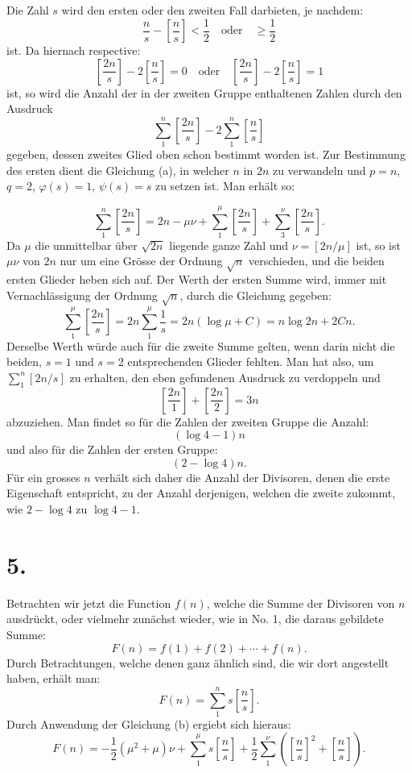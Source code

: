 \documentclass[11pt]{article}
\newcommand{\floor}[1]{\left[#1\right]}
\begin{document}
Die Zahl $s$ wird den ersten oder den zweiten Fall darbieten, je nachdem:
\[
 \frac ns-\floor{\frac ns}<\frac12\quad \text{oder}\quad \geq\frac12
\]
ist. Da hiernach respective:
\[
 \floor{\frac{2n}{s}}-2\floor{\frac ns}=0\quad \text{oder}\quad
 \floor{\frac{2n}{s}}-2\floor{\frac ns}=1
\]
ist, so wird die Anzahl der in der zweiten Gruppe enthaltenen Zahlen durch den Ausdruck
\[
 \sum_{1}^{n}\floor{\frac{2n}{s}}-2\sum_{1}^{n}\floor{\frac ns}
\]
gegeben, dessen zweites Glied oben schon bestimmt worden ist. Zur Bestimmung des ersten dient die Gleichung (a), in welcher $n$ in $2n$ zu verwandeln und $p=n$, $q=2$, $\varphi(s)=1$, $\psi(s)=s$ zu setzen ist. Man erhält so:

\[
 \sum_{1}^{n}\floor{\frac{2n}{s}}=2n-\mu\nu+
 \sum_{1}^{\mu}\floor{\frac{2n}{s}}+
 \sum_{3}^{\nu}\floor{\frac{2n}{s}}.
\]
Da $\mu$ die unmittelbar über $\sqrt{2n}$ liegende ganze Zahl und $\nu=\floor{2n/\mu}$ ist, so ist $\mu\nu$ von $2n$ nur um eine Grösse der Ordnung $\sqrt n$ verschieden, und die beiden ersten Glieder heben sich auf. Der Werth der ersten Summe wird, immer mit Vernachlässigung der Ordnung $\sqrt n$, durch die Gleichung gegeben:
\[
 \sum_{1}^{\mu}\floor{\frac{2n}{s}}=2n\sum_{1}^{\mu}\frac1s=2n(\log\mu+C)=n\log 2n+2Cn.
\]
Derselbe Werth würde auch für die zweite Summe gelten, wenn darin nicht die beiden, $s=1$ und $s=2$ entsprechenden Glieder fehlten. Man hat also, um $\sum_1^n\floor{2n/s}$ zu erhalten, den eben gefundenen Ausdruck zu verdoppeln und
\[
 \floor{\frac{2n}{1}}+\floor{\frac{2n}{2}}=3n
\]
abzuziehen. Man findet so für die Zahlen der zweiten Gruppe die Anzahl:
\[
 (\log4-1)n
\]
und also für die Zahlen der ersten Gruppe:
\[
 (2-
\log4)n.
\]
Für ein grosses $n$ verhält sich daher die Anzahl der Divisoren, denen die erste Eigenschaft entspricht, zu der Anzahl derjenigen, welchen die zweite zukommt, wie $2-\log4$ zu $\log4-1$.

\section*{5.}

Betrachten wir jetzt die Function $f(n)$, welche die Summe der Divisoren von $n$ ausdrückt, oder vielmehr zunächst wieder, wie in No. 1, die daraus gebildete Summe:
\[
 F(n)=f(1)+f(2)+\cdots+f(n).
\]
Durch Betrachtungen, welche denen ganz ähnlich sind, die wir dort angestellt haben, erhält man:
\[
 F(n)=\sum_{1}^{n}s\floor{\frac ns}.
\]
Durch Anwendung der Gleichung (b) ergiebt sich hieraus:
\[
 F(n)=-\frac12(\mu^2+\mu)\nu+
 \sum_{1}^{\mu}s\floor{\frac ns}+\frac12\sum_{1}^{\nu}\left(\floor{\frac ns}^{2}+\floor{\frac ns}\right).
\]
\end{document}
